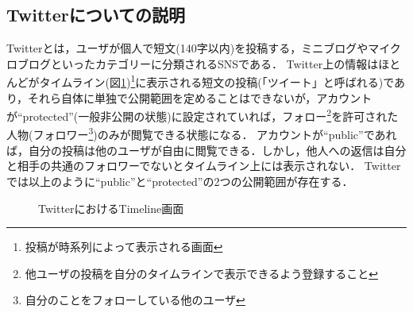 \subsection{Twitterについての説明}
Twitterとは，ユーザが個人で短文(140字以内)を投稿する，ミニブログやマイクロブログといったカテゴリーに分類されるSNSである．
Twitter上の情報はほとんどがタイムライン(図\ref{fig:twitterTimeline})\footnote{投稿が時系列によって表示される画面}に表示される短文の投稿(「ツイート」と呼ばれる)であり，それら自体に単独で公開範囲を定めることはできないが，アカウントが``protected''(一般非公開の状態)に設定されていれば，フォロー\footnote{他ユーザの投稿を自分のタイムラインで表示できるよう登録すること}を許可された人物(フォロワー\footnote{自分のことをフォローしている他のユーザ})のみが閲覧できる状態になる．
アカウントが``public''であれば，自分の投稿は他のユーザが自由に閲覧できる．しかし，他人への返信は自分と相手の共通のフォロワーでないとタイムライン上には表示されない．
Twitterでは以上のように``public''と``protected''の2つの公開範囲が存在する\cite{twitterProtected}．

\begin{figure}[th]
\begin{center}
\end{center}
\caption{TwitterにおけるTimeline画面}
\label{fig:twitterTimeline}
\end{figure}
